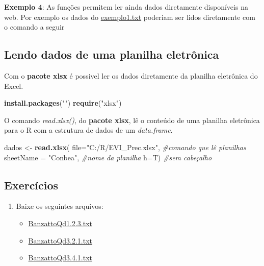 \documentclass[]{book}
\newenvironment{Shaded}{\begin{snugshade}}{\end{snugshade}}
\newcommand{\CommentTok}[1]{\textcolor[rgb]{0.56,0.35,0.01}{\textit{#1}}}
\newcommand{\DataTypeTok}[1]{\textcolor[rgb]{0.13,0.29,0.53}{#1}}
\newcommand{\KeywordTok}[1]{\textcolor[rgb]{0.13,0.29,0.53}{\textbf{#1}}}
\newcommand{\NormalTok}[1]{#1}
\newcommand{\StringTok}[1]{\textcolor[rgb]{0.31,0.60,0.02}{#1}}
\providecommand{\tightlist}{%
  \setlength{\itemsep}{0pt}\setlength{\parskip}{0pt}}
\begin{document}
\textbf{Exemplo 4}: As funções permitem ler ainda dados diretamente disponíveis na web. Por exemplo os dados do \href{https://www.dropbox.com/s/m7jivbbggei5y0x/exemplo1.txt?dl=1}{exemplo1.txt} poderiam ser lidos diretamente com o comando a seguir

\hypertarget{lendo-dados-de-uma-planilha-eletronica}{%
\subsection{Lendo dados de uma planilha eletrônica}\label{lendo-dados-de-uma-planilha-eletronica}}

Com o \textbf{pacote xlsx} é possivel ler os dados diretamente da planilha eletrônica do Excel.

\begin{Shaded}
\begin{Highlighting}[]
\KeywordTok{install.packages}\NormalTok{(}\StringTok{""}\NormalTok{)}
\KeywordTok{require}\NormalTok{(}\StringTok{"xlsx"}\NormalTok{)}
\end{Highlighting}
\end{Shaded}

O comando \emph{read.xlsx()}, do \textbf{pacote xlsx}, lê o conteúdo de uma planilha eletrônica para o R com a estrutura de dados de um \emph{data.frame}.

\begin{Shaded}
\begin{Highlighting}[]
\NormalTok{dados <-}\StringTok{ }\KeywordTok{read.xlsx}\NormalTok{(}
                    \DataTypeTok{file=}\StringTok{"C:/R/EVI_Prec.xlsx"}\NormalTok{,     }\CommentTok{#comando que lê planilhas}
                    \DataTypeTok{sheetName =} \StringTok{"Conbea"}\NormalTok{,          }\CommentTok{#nome da planilha}
                    \DataTypeTok{h=}\NormalTok{T)                           }\CommentTok{#sem cabeçalho  }
\end{Highlighting}
\end{Shaded}

\hypertarget{exercicios}{%
\subsection{Exercícios}\label{exercicios}}

\begin{enumerate}
\def\labelenumi{\arabic{enumi}.}
\tightlist
\item
  Baixe os seguintes arquivos:

  \begin{itemize}
  \tightlist
  \item
    \href{https://www.dropbox.com/s/uq1n2sv8an2eoan/BanzattoQd1.2.3.txt?dl=1}{BanzattoQd1.2.3.txt}
  \item
    \href{https://www.dropbox.com/s/jjyo8dhyy0qt3ft/BanzattoQd3.2.1.txt?dl=1}{BanzattoQd3.2.1.txt}
  \item
    \href{https://www.dropbox.com/s/yv5clm6qljurzbw/BanzattoQd3.4.1.txt?dl=1}{BanzattoQd3.4.1.txt}
  \end{itemize}
\end{enumerate}
\end{document}
